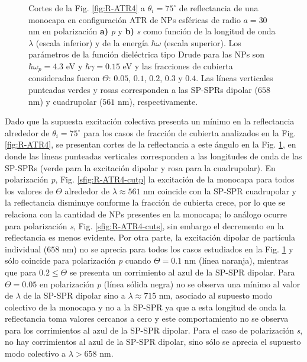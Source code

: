 \begin{figure}[h!]
	\caption{Cortes de la Fig. \ref{fig:R-ATR4} a $\theta_i = 75^\circ$ de reflectancia de una monocapa en configuración ATR de NPs esféricas de radio $a=30$ nm en polarización \textbf{a)} \emph{p} y \textbf{b)} \emph{s} como función de la longitud de onda $\lambda$ (escala inferior) y de la energía $\hbar\omega$ (escala superior). Los parámetros de la función dieléctrica tipo Drude para las NPs son $\hbar\omega_p = 4.3$ eV y $\hbar\gamma = 0.15$ eV y las fracciones de cubierta consideradas fueron $\Theta$: $0. 05$, $0. 1$, $0. 2$, $0. 3$ y $0. 4$. Las líneas verticales punteadas verdes y rosas corresponden a las SP-SPRs dipolar ($658$ nm) y cuadrupolar ($561$ nm), respectivamente. }\label{fig:R-ATR4-Cuts}
	\end{figure}	  

Dado que la supuesta excitación colectiva presenta un mínimo en la reflectancia  alrededor de $\theta_i = 75^\circ$ para los casos de fracción de cubierta analizados en la Fig.  \ref{fig:R-ATR4}, se presentan cortes de la reflectancia a este ángulo en la Fig. \ref{fig:R-ATR4-Cuts}, en donde las líneas punteadas verticales corresponden a las longitudes de onda de las SP-SPRs (verde para la excitación dipolar y rosa para la cuadrupolar). En polarización \emph{p}, Fig. \ref{sfig:R-ATR4-cutp} la excitación de la monocapa para todos los valores de $\Theta$ alrededor de $\lambda \approx 561$ nm coincide con la SP-SPR cuadrupolar y la reflectancia disminuye conforme la fracción de cubierta crece, por lo que se relaciona con la cantidad de NPs presentes en la monocapa; lo análogo ocurre para polarización \emph{s}, Fig. \ref{sfig:R-ATR4-cuts}, sin embargo el decremento en la reflectancia es menos evidente. Por otra parte, la excitación dipolar de partícula individual ($658$ nm) no se aprecia para todos los casos estudiados en la Fig. \ref{fig:R-ATR4-Cuts} y sólo coincide para polarización \emph{p} cuando $\Theta=0.1$ nm (línea naranja), mientras que para $0.2\leq \Theta$ se presenta un corrimiento al azul de la SP-SPR dipolar. Para $\Theta=0.05$ en polarización \emph{p} (línea sólida negra) no se observa una mínimo al valor de $\lambda$ de la SP-SPR dipolar sino a $\lambda\approx 715$ nm, asociado al supuesto modo colectivo de la monocapa y no a la SP-SPR ya que a esta longitud de onda la reflectancia toma valores cercanos a cero y este comportamiento no se observa para los corrimientos al azul de la SP-SPR dipolar. Para el caso de polarización \emph{s}, no hay corrimientos al azul de la SP-SPR dipolar, sino sólo se aprecia el supuesto modo colectivo a $\lambda>658$ nm.

